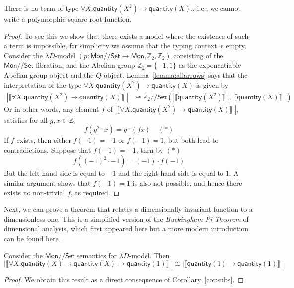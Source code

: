\documentclass[a4paper,UKenglish]{lipics}
\newcommand{\msf}[1]{\mathsf{#1}} %
\newcommand{\Mon}{\msf{Mon}}
\newcommand{\Set}{\msf{Set}}
\newcommand{\GroupSet}[1]{#1/\!/\Set}
\newcommand{\MonSet}{\GroupSet{\Mon}}
\newcommand{\bbZ}{\mathbb{Z}}
\newcommand{\sem}[1]{\ensuremath{\llbracket #1 \rrbracket} \;}
\newcommand{\qnt}{\msf{quantity}}
\begin{document}
\begin{theorem}
\label{thm:UninhabType}
 There is no term of type $\forall X . \qnt(X^2) \rightarrow \qnt(X)$., i.e., we cannot write a polymorphic square root function.
\end{theorem}
\begin{proof}
To see this we show that there exists a model where the existence of such a term is impossible, for simplicity we assume that the typing context is empty. Consider the $\lambda D$-model $(p:\MonSet \rightarrow \Mon, \mathbb{Z}_2, \mathbb{Z}_2)$  consisting of the $\MonSet$ fibration, and the Abelian group $\mathbb{Z}_2 = \{ -1, 1\}$ as the exponentiable Abelian group object and the $Q$ object. Lemma~\ref{lemma:allarrows} says that the interpretation of the type $\forall X . \qnt(X^2) \rightarrow \qnt(X)$ is given by
\begin{align*}
  |\sem{\forall X . \qnt(X^2) \rightarrow \qnt(X)}|  &  \cong \GroupSet{\mathbb{Z}_2} (|\sem{\qnt (X^2)}|, |\sem{\qnt(X)}|)
\end{align*}
Or in other words, any element $f$ of $ |\sem{\forall X . \qnt(X^2) \rightarrow \qnt(X)}|$, satisfies for all $g, x \in \bbZ_2$
\[
f (g^2 \cdot x) = g \cdot (fx) \; \; \; \; (\ast)
\]
If $f$ exists, then either $f(-1) = -1$ or $f(-1) = 1$, but both lead to contradictions. Suppose that $f(-1) = -1$, then by $(\ast)$
\[
 f((-1)^2 \cdot -1) = (-1) \cdot f(-1)
\]
But the left-hand side is equal to $-1$ and the right-hand side is equal to $1$. A similar argument shows that $f(-1)=1$ is also not possible, and hence there exists no non-trivial $f$, as required.
\end{proof}

Next, we can prove a theorem that relates a dimensionally invariant function to a dimensionless one. This is a simplified version of the \emph{Buckingham Pi Theorem} of dimensional analysis, which first appeared here \cite{buckingham1914physically} but a more modern introduction can be found here \cite{sonin2001physical}.

\begin{theorem}
 \label{lem:AppSubs}
Consider the $\MonSet$ semantics for $\lambda D$-model. Then
\[
 |\sem{\forall X . \qnt(X) \rightarrow \qnt(X) \rightarrow \qnt(1)}| \cong |\sem{\qnt(1)\rightarrow \qnt(1)}|
\]
\end{theorem}
\begin{proof}
We obtain this result as a direct consequence of Corollary~\ref{cor:subs}.
\end{proof}
\end{document}
